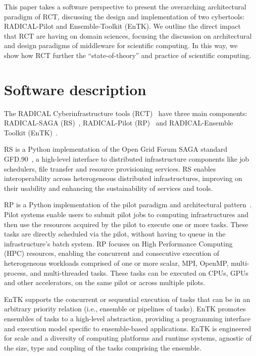 \documentclass[preprint,12pt, a4paper]{elsarticle}
\begin{document}
This paper takes a software perspective to present the overarching
architectural paradigm of RCT, discussing the design and implementation of
two cybertools: RADICAL-Pilot and Ensemble-Toolkit (EnTK). We outline the
direct impact that RCT are having on domain sciences, focusing the discussion
on architectural and design paradigms of middleware for scientific computing.
In this way, we show how RCT further the ``state-of-theory'' and practice of
scientific computing.


\section{Software description}\label{sec:description}


The RADICAL Cyberinfrastructure tools (RCT)~\cite{web-rct} have three main
components: RADICAL-SAGA (RS)~\cite{merzky2015saga}, RADICAL-Pilot
(RP)~\cite{merzky2018using} and RADICAL-Ensemble Toolkit
(EnTK)~\cite{balasubramanian2018harnessing}.

RS is a Python implementation of the Open Grid Forum SAGA standard 
GFD.90~\cite{goodale2006saga}, a high-level interface to distributed
infrastructure components like job schedulers, file transfer and resource
provisioning services. RS enables interoperability across heterogeneous
distributed infrastructures, improving on their usability and enhancing the
sustainability of services and tools.

RP is a Python implementation of the pilot paradigm and architectural
pattern~\cite{turilli2018comprehensive}. Pilot systems enable users to submit
pilot jobs to computing infrastructures and then use the resources acquired
by the pilot to execute one or more tasks. These tasks are directly scheduled
via the pilot, without having to queue in the infrastructure's batch system.
RP focuses on High Performance Computing (HPC) resources, enabling the
concurrent and consecutive execution of heterogeneous workloads comprised of
one or more scalar, MPI, OpenMP, multi-process, and multi-threaded tasks.
These tasks can be executed on CPUs, GPUs and other accelerators, on the same
pilot or across multiple pilots.

EnTK supports the concurrent or sequential execution of tasks that can be in
an arbitrary priority relation (i.e., ensemble or pipelines of tasks). EnTK
promotes ensembles of tasks to a high-level abstraction, providing a
programming interface and execution model specific to ensemble-based
applications. EnTK is engineered for scale and a diversity of computing
platforms and runtime systems, agnostic of the size, type and coupling of the
tasks comprising the ensemble.
\end{document}

